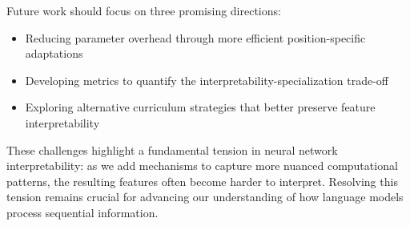 \documentclass{article} %
\begin{document}
Future work should focus on three promising directions:
\begin{itemize}
    \item Reducing parameter overhead through more efficient position-specific adaptations
    \item Developing metrics to quantify the interpretability-specialization trade-off
    \item Exploring alternative curriculum strategies that better preserve feature interpretability
\end{itemize}

These challenges highlight a fundamental tension in neural network interpretability: as we add mechanisms to capture more nuanced computational patterns, the resulting features often become harder to interpret. Resolving this tension remains crucial for advancing our understanding of how language models process sequential information.



\end{document}
